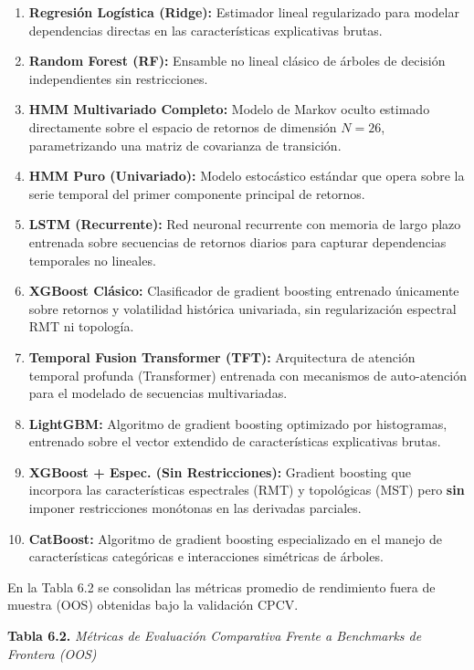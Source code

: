 \documentclass[
  12pt,
]{article}
\providecommand{\tightlist}{%
  \setlength{\itemsep}{0pt}\setlength{\parskip}{0pt}}
\begin{document}
\begin{enumerate}
\def\labelenumi{\arabic{enumi}.}
\tightlist
\item
  \textbf{Regresión Logística (Ridge):} Estimador lineal regularizado
  para modelar dependencias directas en las características explicativas
  brutas.
\item
  \textbf{Random Forest (RF):} Ensamble no lineal clásico de árboles de
  decisión independientes sin restricciones.
\item
  \textbf{HMM Multivariado Completo:} Modelo de Markov oculto estimado
  directamente sobre el espacio de retornos de dimensión \(N=26\),
  parametrizando una matriz de covarianza de transición.
\item
  \textbf{HMM Puro (Univariado):} Modelo estocástico estándar que opera
  sobre la serie temporal del primer componente principal de retornos.
\item
  \textbf{LSTM (Recurrente):} Red neuronal recurrente con memoria de
  largo plazo entrenada sobre secuencias de retornos diarios para
  capturar dependencias temporales no lineales.
\item
  \textbf{XGBoost Clásico:} Clasificador de gradient boosting entrenado
  únicamente sobre retornos y volatilidad histórica univariada, sin
  regularización espectral RMT ni topología.
\item
  \textbf{Temporal Fusion Transformer (TFT):} Arquitectura de atención
  temporal profunda (Transformer) entrenada con mecanismos de
  auto-atención para el modelado de secuencias multivariadas.
\item
  \textbf{LightGBM:} Algoritmo de gradient boosting optimizado por
  histogramas, entrenado sobre el vector extendido de características
  explicativas brutas.
\item
  \textbf{XGBoost + Espec. (Sin Restricciones):} Gradient boosting que
  incorpora las características espectrales (RMT) y topológicas (MST)
  pero \textbf{sin} imponer restricciones monótonas en las derivadas
  parciales.
\item
  \textbf{CatBoost:} Algoritmo de gradient boosting especializado en el
  manejo de características categóricas e interacciones simétricas de
  árboles.
\end{enumerate}

En la Tabla 6.2 se consolidan las métricas promedio de rendimiento fuera
de muestra (OOS) obtenidas bajo la validación CPCV.

\textbf{Tabla 6.2.} \emph{Métricas de Evaluación Comparativa Frente a
Benchmarks de Frontera (OOS)}
\end{document}
